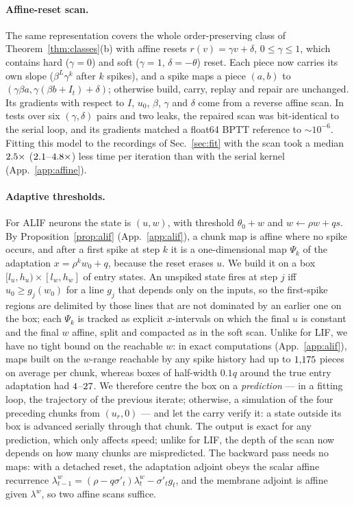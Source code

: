 \documentclass[10pt]{article}
\theoremstyle{remark}
\begin{document}
\paragraph{Affine-reset scan.}
The same representation covers the whole order-preserving class of Theorem~\ref{thm:classes}(b) with affine resets $r(v)=\gamma v+\delta$, $0\le\gamma\le1$, which contains hard ($\gamma=0$) and soft ($\gamma=1$, $\delta=-\theta$) reset. Each piece now carries its own slope ($\beta^L\gamma^k$ after $k$ spikes), and a spike maps a piece $(a,b)$ to $(\gamma\beta a,\gamma(\beta b+I_t)+\delta)$; otherwise build, carry, replay and repair are unchanged. Its gradients with respect to $I$, $u_0$, $\beta$, $\gamma$ and $\delta$ come from a reverse affine scan. In tests over six $(\gamma,\delta)$ pairs and two leaks, the repaired scan was bit-identical to the serial loop, and its gradients matched a float64 BPTT reference to $\sim10^{-6}$. Fitting this model to the recordings of Sec.~\ref{sec:fit} with the scan took a median $2.5\times$ ($2.1$--$4.8\times$) less time per iteration than with the serial kernel (App.~\ref{app:affine}).

\paragraph{Adaptive thresholds.}
For ALIF neurons the state is $(u,w)$, with threshold $\theta_0+w$ and $w\leftarrow\rho w+qs$. By Proposition~\ref{prop:alif} (App.~\ref{app:alif}), a chunk map is affine where no spike occurs, and after a first spike at step $k$ it is a one-dimensional map $\Psi_k$ of the adaptation $x=\rho^kw_0+q$, because the reset erases $u$. We build it on a box $[l_u,h_u)\times[l_w,h_w]$ of entry states. An unspiked state fires at step $j$ iff $u_0\ge g_j(w_0)$ for a line $g_j$ that depends only on the inputs, so the first-spike regions are delimited by those lines that are not dominated by an earlier one on the box; each $\Psi_k$ is tracked as explicit $x$-intervals on which the final $u$ is constant and the final $w$ affine, split and compacted as in the soft scan. Unlike for LIF, we have no tight bound on the reachable $w$: in exact computations (App.~\ref{app:alif}), maps built on the $w$-range reachable by any spike history had up to $1{,}175$ pieces on average per chunk, whereas boxes of half-width $0.1q$ around the true entry adaptation had $4$--$27$. We therefore centre the box on a \emph{prediction} --- in a fitting loop, the trajectory of the previous iterate; otherwise, a simulation of the four preceding chunks from $(u_r,0)$ --- and let the carry verify it: a state outside its box is advanced serially through that chunk. The output is exact for any prediction, which only affects speed; unlike for LIF, the depth of the scan now depends on how many chunks are mispredicted. The backward pass needs no maps: with a detached reset, the adaptation adjoint obeys the scalar affine recurrence $\lambda^w_{t-1}=(\rho-q\sigma'_t)\lambda^w_t-\sigma'_tg_t$, and the membrane adjoint is affine given $\lambda^w$, so two affine scans suffice.
\end{document}
